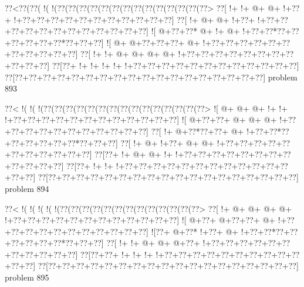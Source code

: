 \vbox{\vbox{\goo
\0??<\0??(\0??(\- !(\- !(\0??(\0??(\0??(\0??(\0??(\0??(\0??(\0??(\0??(\0??(\0??(\0??(\0??(\0??>
\0??[\- !+\- !+\- @+\- @+\- !+\0??+\- !+\0??+\0??+\0??+\0??+\0??+\0??+\0??+\0??+\0??+\0??+\0??]
\0??[\- !+\- @+\- @+\- !+\0??+\- !+\0??+\0??+\0??+\0??+\0??+\0??+\0??+\0??+\0??+\0??+\0??+\0??]
\- ![\- @+\0??+\0??*\- @+\- !+\- @+\- !+\0??+\0??*\0??+\0??+\0??+\0??+\0??+\0??*\0??+\0??+\0??]
\- ![\- @+\- @+\0??+\0??+\0??+\- @+\- !+\0??+\0??+\0??+\0??+\0??+\0??+\0??+\0??+\0??+\0??+\0??]
\0??[\- !+\- !+\- @+\- @+\- @+\- @+\- !+\0??+\0??+\0??+\0??+\0??+\0??+\0??+\0??+\0??+\0??+\0??]
\0??[\0??+\- !+\- !+\- !+\- !+\- !+\0??+\0??+\0??+\0??+\0??+\0??+\0??+\0??+\0??+\0??+\0??+\0??]
\0??[\0??+\0??+\0??+\0??+\0??+\0??+\0??+\0??+\0??+\0??+\0??+\0??+\0??+\0??+\0??+\0??+\0??+\0??]
}
\hfil problem 893\hfil\break
}



\vbox{\vbox{\goo
\0??<\- !(\- !(\- !(\0??(\0??(\0??(\0??(\0??(\0??(\0??(\0??(\0??(\0??(\0??(\0??(\0??(\0??(\0??>
\- ![\- @+\- @+\- @+\- !+\- !+\- !+\0??+\0??+\0??+\0??+\0??+\0??+\0??+\0??+\0??+\0??+\0??+\0??]
\- ![\- @+\0??+\0??+\- @+\- @+\- @+\- !+\0??+\0??+\0??+\0??+\0??+\0??+\0??+\0??+\0??+\0??+\0??]
\0??[\- !+\- @+\0??*\0??+\0??+\- @+\- !+\0??+\0??*\0??+\0??+\0??+\0??+\0??+\0??*\0??+\0??+\0??]
\0??[\- !+\- @+\- !+\0??+\- @+\- @+\- !+\0??+\0??+\0??+\0??+\0??+\0??+\0??+\0??+\0??+\0??+\0??]
\0??[\0??+\- !+\- @+\- @+\- !+\- !+\0??+\0??+\0??+\0??+\0??+\0??+\0??+\0??+\0??+\0??+\0??+\0??]
\0??[\0??+\- !+\- !+\- !+\0??+\0??+\0??+\0??+\0??+\0??+\0??+\0??+\0??+\0??+\0??+\0??+\0??+\0??]
\0??[\0??+\0??+\0??+\0??+\0??+\0??+\0??+\0??+\0??+\0??+\0??+\0??+\0??+\0??+\0??+\0??+\0??+\0??]
}
\hfil problem 894\hfil\break
}



\vbox{\vbox{\goo
\0??<\- !(\- !(\- !(\- !(\- !(\0??(\0??(\0??(\0??(\0??(\0??(\0??(\0??(\0??(\0??(\0??(\0??(\0??>
\0??[\- !+\- @+\- @+\- @+\- @+\- !+\0??+\0??+\0??+\0??+\0??+\0??+\0??+\0??+\0??+\0??+\0??+\0??]
\- ![\- @+\0??+\- @+\0??+\0??+\- @+\- !+\0??+\0??+\0??+\0??+\0??+\0??+\0??+\0??+\0??+\0??+\0??]
\- ![\0??+\- @+\0??*\- !+\0??+\- @+\- !+\0??+\0??*\0??+\0??+\0??+\0??+\0??+\0??*\0??+\0??+\0??]
\0??[\- !+\- !+\- @+\- @+\- @+\0??+\- !+\0??+\0??+\0??+\0??+\0??+\0??+\0??+\0??+\0??+\0??+\0??]
\0??[\0??+\0??+\- !+\- !+\- !+\- !+\0??+\0??+\0??+\0??+\0??+\0??+\0??+\0??+\0??+\0??+\0??+\0??]
\0??[\0??+\0??+\0??+\0??+\0??+\0??+\0??+\0??+\0??+\0??+\0??+\0??+\0??+\0??+\0??+\0??+\0??+\0??]
}
\hfil problem 895\hfil\break
}



